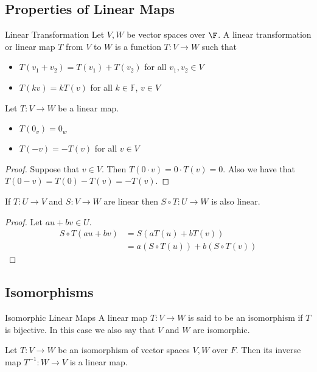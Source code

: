 \subsection{Properties of Linear Maps}
\begin{defn}{Linear Transformation}{} Let $V,W$ be vector spaces over $\F$. A linear transformation or linear map $T$ from $V$ to $W$ is a function $T:V\to W$ such that 
\begin{itemize}
\item $T(v_1+v_2)=T(v_1)+T(v_2)$ for all $v_1,v_2\in V$
\item $T(kv)=kT(v)$ for all $k\in\mathbb{F}$, $v\in V$
\end{itemize}
\end{defn}

\begin{lmm}{}{} Let $T:V\to W$ be a linear map. 
\begin{itemize}
\item $T(0_v)=0_w$
\item $T(-v)=-T(v)$ for all $v\in V$
\end{itemize}\tcbline
\begin{proof} Suppose that $v\in V$. Then $T(0\cdot v)=0\cdot T(v)=0$. Also we have that $T(0-v)=T(0)-T(v)=-T(v)$. 
\end{proof}
\end{lmm}

\begin{prp}{}{} If $T:U\to V$ and $S:V\to W$ are linear then $S\circ T:U\to W$ is also linear. \tcbline
\begin{proof} Let $au+bv\in U$. 
\begin{align*}
S\circ T(au+bv)&=S(aT(u)+bT(v))\\
&=a(S\circ T(u))+b(S\circ T(v))
\end{align*}
\end{proof}
\end{prp}

\subsection{Isomorphisms}
\begin{defn}{Isomorphic Linear Maps}{} A linear map $T:V\to W$ is said to be an isomorphism if $T$ is bijective. In this case we also say that $V$ and $W$ are isomorphic. 
\end{defn}

\begin{thm}{}{} Let $T:V\to W$ be an isomorphism of vector spaces $V,W$ over $F$. Then its inverse map $T^{-1}:W\to V$ is a linear map. 
\end{thm}

